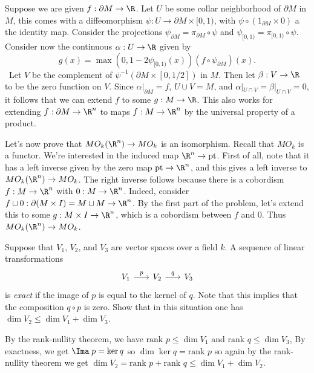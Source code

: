 \documentclass[11pt,letterpaper]{article}
\def\rank{\textrm{rank }}
\begin{document}
\begin{solution}
    \quad Suppose we are given $f: \partial M \to \R$. Let $U$ be some collar neighborhood of $\partial M$ in $M$, this comes with a diffeomorphism $\psi : U \to \partial M \times [0,1)$, with $\psi\circ (1_{\partial M}\times 0)$ a the identity map. Consider the projections $\psi_{\partial M}=\pi_{\partial M}\circ \psi$ and $\psi_{[0,1)}=\pi_{[0,1)}\circ \psi$. Consider now the continuous $\alpha : U \to \R$ given by \[g(x)=\max(0, 1 - 2\psi_{[0,1)}(x)) ( f\circ \psi_{\partial M})(x).\]\
    Let $V$ be the complement of $\psi^{-1}(\partial M\times [0, 1 / 2])$ in $M$. Then let $\beta : V \to \R$ to be the zero function on $V$. Since $\alpha|_{\partial M} = f$, $U\cup V = M$, and $\alpha|_{U\cap V}=\beta|_{U\cap V} = 0$, it follows that we can extend $f$ to some $g : M \to \R$. This also works for extending $f : \partial M \to \R^n$ to maps $f : M \to \R^n$ by the universal property of a product.

    \quad Let's now prove that $MO_k(\R^n) \to MO_k$ is an isomorphism. Recall that $MO_k$ is a functor. We're interested in the induced map $\R^n \to \textrm{pt}$. First of all, note that it has a left inverse given by the zero map $\textrm{pt} \to \R^n$, and this gives a left inverse to $MO_k(\R^n)\to MO_k$. The right inverse follows because there is a cobordism $f : M\to \R^n$ with $0 : M\to \R^n$. Indeed, consider $f\sqcup 0 : \partial(M\times I) = M\sqcup M \to \R^n$. By the first part of the problem, let's extend this to some $g : M\times I \to \R^n$, which is a cobordism between $f$ and $0$. Thus $MO_k(\R^n) \to MO_k$.
\end{solution}

\begin{problem}
    {Suppose that $V_1$, $V_2$, and $V_3$ are vector spaces over a field $k$. A sequence of linear transformations
    \[\begin{tikzcd}[column sep=scriptsize]
        {V_1} & {V_2} & {V_3}
        \arrow["p", from=1-1, to=1-2]
        \arrow["q", from=1-2, to=1-3]
    \end{tikzcd}\]
    is \emph{exact} if the image of $p$ is equal to the kernel of $q$. Note that this implies that the composition $q \circ p$ is zero. Show that in this situation one has $\dim V_2 \leq \dim V_1 + \dim V_3$.}
\end{problem}

\begin{solution}
    \quad By the rank-nullity theorem, we have $\rank p\leq \dim V_1$ and $\rank q\leq \dim V_3$, By exactness, we get $\Ima\;p = \ker q$ so $\dim \ker q = \rank p$ so again by the rank-nullity theorem we get $\dim V_2=\rank p + \rank q \leq \dim V_1 + \dim V_2.$
\end{solution}
\end{document}
